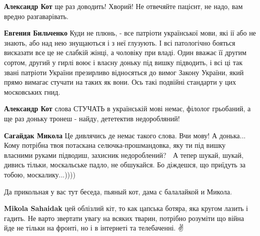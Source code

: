 \begin{itemize}
\begin{itemize}

\textbf{Александр Кот} ще раз доводить! Хворий! Не отвечяйте пацієнт, не надо, вам вредно разгаварівать.


\textbf{Евгения Бильченко} Куди не плюнь, - все патріоти української мови, які ії або не знають, або над нею знущаються і з неї глузують. І всі патологічно бояться висказати все це не слабкій жінці, а чоловіку при владі. Один вважає її другим сортом, другий у гирлі воює і власну доньку під вишку підводить, і всі ці так звані патріоти України презирливо відносяться до вимог Закону України, який прямо вимагає стучати на таких як вони. Ось такі подвійні стандарти у цих московських гнид.


\textbf{Александр Кот} слова СТУЧАТЬ в українській мові немає, філолог грьобаний, а ще раз доньку тронеш - найду, дететектив недоробляний!


\textbf{Сагайдак Микола} Це дивлячись де немає такого слова. Вчи мову! А донька... Кому потрібна твоя потаскана селючка-прошмандовка, яку ти під вишку власними руками підводиш, захисник недороблений? 🤣 А тепер шукай, шукай, дивись тільки, москальське падло, не обшукайся. Бо діждешся, що приїдуть за тобою, москалику...))))


Да прикольная у вас тут беседа, пьяный кот, дама с балалайкой и Микола. 🤣


\textbf{Mikola Sahaidak} цей облізлий кіт, то как цапська ботяра, яка кругом лазить і гадить. Не варто звертати увагу на всяких тварин, потрібно розуміти що війна йде не тільки на фронті, но і в інтернеті та телебаченні. ✌️



\end{itemize}
\end{itemize}
